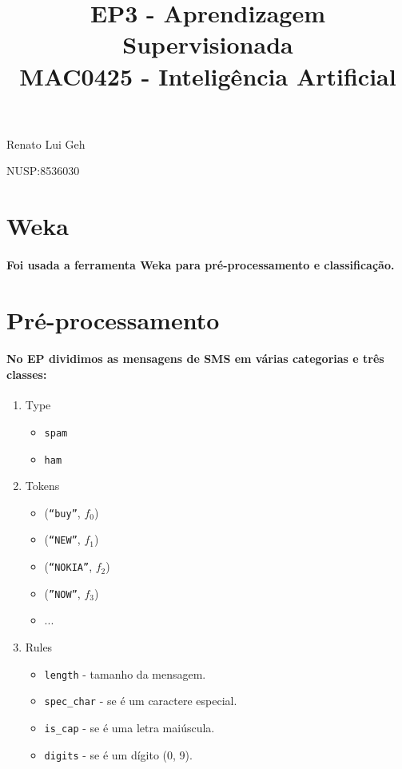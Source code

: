 \documentclass[a4paper,10pt]{article}
\title{\textbf{EP3 - Aprendizagem Supervisionada}\\
  \Large{MAC0425 - Inteligência Artificial}}
\theoremstyle{plain}
\begin{document}
\date{}
\author{}
\vspace*{-40pt}
{\let\newpage\relax\maketitle}

Renato Lui Geh

NUSP:8536030

\section{Weka}

\paragraph{
  Foi usada a ferramenta Weka para pré-processamento e classificação.
}

\section{Pré-processamento}

\paragraph{
  No EP dividimos as mensagens de SMS em várias categorias e três classes:
}

\begin{enumerate}
  \item Type
    \begin{itemize}
      \item \texttt{spam}
      \item \texttt{ham}
    \end{itemize}
  \item Tokens
    \begin{itemize}
      \item (\texttt{``buy''}, $f_0$)
      \item (\texttt{``NEW''}, $f_1$)
      \item (\texttt{``NOKIA''}, $f_2$)
      \item (\texttt{''NOW''}, $f_3$)
      \item ...
    \end{itemize}
  \item Rules
    \begin{itemize}
      \item \texttt{length} - tamanho da mensagem.
      \item \texttt{spec\_char} - se é um caractere especial.
      \item \texttt{is\_cap} - se é uma letra maiúscula.
      \item \texttt{digits} - se é um dígito (0, 9).
    \end{itemize}
\end{enumerate}
\end{document}
